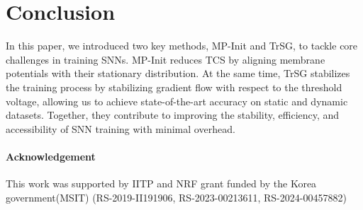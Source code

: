 \section{Conclusion}
\label{sec:conclusion}

In this paper, we introduced two key methods, MP-Init and TrSG, to tackle core challenges in training SNNs. MP-Init reduces TCS by aligning membrane potentials with their stationary distribution. At the same time, TrSG stabilizes the training process by stabilizing gradient flow with respect to the threshold voltage, allowing us to achieve state-of-the-art accuracy on static and dynamic datasets. Together, they contribute to improving the stability, efficiency, and accessibility of SNN training with minimal overhead.

\paragraph{Acknowledgement} This work was supported by IITP and NRF grant funded by the Korea government(MSIT) (RS-2019-II191906, RS-2023-00213611, RS-2024-00457882)